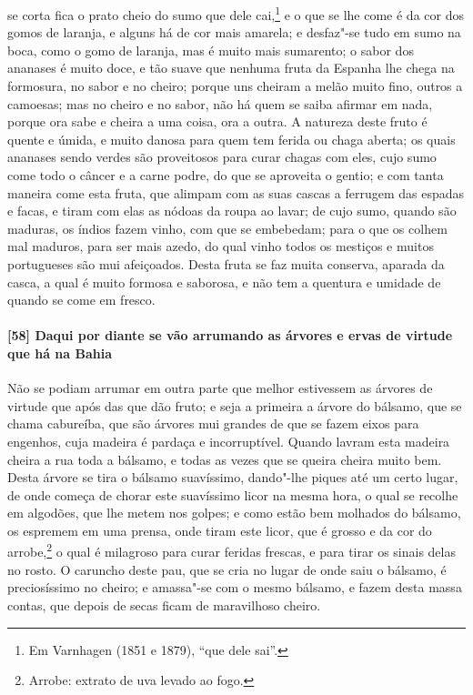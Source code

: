 se corta fica o prato cheio do sumo que dele cai,\footnote{ Em Varnhagen (1851 e 1879),
``que dele sai''.} e o que se lhe come é da cor dos gomos de laranja, e alguns há de cor
mais amarela; e desfaz"-se tudo em sumo na boca, como o gomo de laranja, mas é muito mais
sumarento; o sabor dos ananases é muito doce, e tão suave que nenhuma fruta da Espanha lhe
chega na formosura, no sabor e no cheiro; porque uns cheiram a melão muito fino, outros a
camoesas; mas no cheiro e no sabor, não há quem se saiba afirmar em nada, porque ora sabe
e cheira a uma coisa, ora a outra. A natureza deste fruto é quente e úmida, e muito danosa
para quem tem ferida ou chaga aberta; os quais ananases sendo verdes são proveitosos para
curar chagas com eles, cujo sumo come todo o câncer e a carne podre, do que se aproveita o
gentio; e com tanta maneira come esta fruta, que alimpam com as suas cascas a ferrugem das
espadas e facas, e tiram com elas as nódoas da roupa ao lavar; de cujo sumo, quando são
maduras, os índios fazem vinho, com que se embebedam; para o que os colhem mal maduros,
para ser mais azedo, do qual vinho todos os mestiços e muitos portugueses são mui
afeiçoados. Desta fruta se faz muita conserva, aparada da casca, a qual é muito formosa e
saborosa, e não tem a quentura e umidade de quando se come em fresco.

\paragraph{[58] Daqui por diante se vão arrumando as árvores e ervas de virtude que há na
Bahia}\quad
Não se podiam arrumar em outra parte que melhor estivessem as árvores de virtude que após
das que dão fruto; e seja a primeira a árvore do bálsamo, que se chama cabureíba, que são
árvores mui grandes de que se fazem eixos para engenhos, cuja madeira é pardaça e
incorruptível. Quando lavram esta madeira cheira a rua toda a bálsamo, e todas as vezes
que se queira cheira muito bem. Desta árvore se tira o bálsamo suavíssimo, dando"-lhe
piques até um certo lugar, de onde começa de chorar este suavíssimo licor na mesma hora, o
qual se recolhe em algodões, que lhe metem nos golpes; e como estão bem molhados do
bálsamo, os espremem em uma prensa, onde tiram este licor, que é grosso e da cor do
arrobe,\footnote{ Arrobe: extrato de uva levado ao fogo.} o qual é milagroso para curar
feridas frescas, e para tirar os sinais delas no rosto. O caruncho deste pau, que se cria
no lugar de onde saiu o bálsamo, é preciosíssimo no cheiro; e amassa"-se com o mesmo
bálsamo, e fazem desta massa contas, que depois de secas ficam de maravilhoso cheiro.

